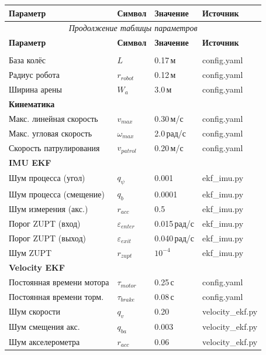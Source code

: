 \documentclass[12pt, a4paper]{article}
\begin{document}
\begin{longtable}{p{4.5cm} p{3.5cm} p{2.5cm} p{3cm}}
\toprule
\textbf{Параметр} & \textbf{Символ} & \textbf{Значение} & \textbf{Источник} \\
\midrule
\endfirsthead
\multicolumn{4}{c}{\small\itshape Продолжение таблицы параметров} \\
\toprule
\textbf{Параметр} & \textbf{Символ} & \textbf{Значение} & \textbf{Источник} \\
\midrule
\endhead
\bottomrule
\endlastfoot

\multicolumn{4}{l}{\textbf{Геометрия робота}} \\
База колёс & $L$ & 0.17\,м & config.yaml \\
Радиус робота & $r_{robot}$ & 0.12\,м & config.yaml \\
Ширина арены & $W_a$ & 3.0\,м & config.yaml \\
\midrule
\multicolumn{4}{l}{\textbf{Кинематика}} \\
Макс. линейная скорость & $v_{max}$ & 0.30\,м/с & config.yaml \\
Макс. угловая скорость & $\omega_{max}$ & 2.0\,рад/с & config.yaml \\
Скорость патрулирования & $v_{patrol}$ & 0.20\,м/с & config.yaml \\
\midrule
\multicolumn{4}{l}{\textbf{IMU EKF}} \\
Шум процесса (угол) & $q_\psi$ & 0.001 & ekf\_imu.py \\
Шум процесса (смещение) & $q_b$ & 0.0001 & ekf\_imu.py \\
Шум измерения (акс.) & $r_{acc}$ & 0.5 & ekf\_imu.py \\
Порог ZUPT (вход) & $\varepsilon_{enter}$ & 0.015\,рад/с & ekf\_imu.py \\
Порог ZUPT (выход) & $\varepsilon_{exit}$ & 0.040\,рад/с & ekf\_imu.py \\
Шум ZUPT & $r_{zupt}$ & $10^{-4}$ & ekf\_imu.py \\
\midrule
\multicolumn{4}{l}{\textbf{Velocity EKF}} \\
Постоянная времени мотора & $\tau_{motor}$ & 0.25\,с & config.yaml \\
Постоянная времени торм. & $\tau_{brake}$ & 0.08\,с & config.yaml \\
Шум скорости & $q_v$ & 0.20 & velocity\_ekf.py \\
Шум смещения акс. & $q_{ba}$ & 0.003 & velocity\_ekf.py \\
Шум акселерометра & $r_{acc}$ & 0.06 & velocity\_ekf.py \\

\end{longtable}
\end{document}
